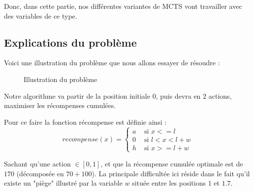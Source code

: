 \documentclass[pdftex,french, english]{article}	%
\begin{document}
	Donc, dans cette partie, nos différentes variantes de MCTS vont travailler avec des variables de ce type.

	\subsection{Explications du problème}

	Voici une illustration du problème \cite{couetoux01} que nous allons essayer de résoudre : \\

	\begin{figure}[h]
	\centering
		\caption{Illustration du problème} \label{fig:probleme}
	\end{figure}

	Notre algorithme va partir de la position initiale $0$, puis devra en $2$ actions, maximiser les récompenses cumulées.

	Pour ce faire la fonction récompense est définie ainsi :
	$$recompense(x) = \left\{
	\begin{array}{ll}
 	a & \mbox{ si $x <= l$}\\
 	0 & \mbox{ si $l < x < l + w$}\\
 	h & \mbox{ si $x >= l + w$}
 	\end{array}\right.$$

	Sachant qu'une action $\in [0, 1]$, et que la récompense cumulée optimale est de $170$ (décomposée en $70 + 100$).
	La principale difficultée ici réside dans le fait qu'il existe un "piège" illustré par la variable $w$ située entre les positions $1$ et $1.7$.
\end{document}

